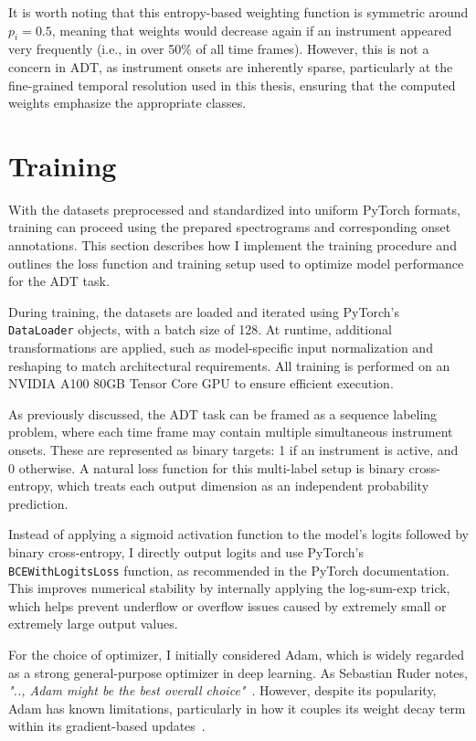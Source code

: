 It is worth noting that this entropy-based weighting function is symmetric around $p_i = 0.5$, meaning that weights would decrease again if an instrument appeared very frequently (i.e., in over 50\% of all time frames). However, this is not a concern in \gls{ADT}, as instrument onsets are inherently sparse, particularly at the fine-grained temporal resolution used in this thesis, ensuring that the computed weights emphasize the appropriate classes.

\section{Training}

With the datasets preprocessed and standardized into uniform PyTorch formats, training can proceed using the prepared spectrograms and corresponding onset annotations. This section describes how I implement the training procedure and outlines the loss function and training setup used to optimize model performance for the \gls{ADT} task.

During training, the datasets are loaded and iterated using PyTorch's \texttt{DataLoader} objects, with a batch size of 128. At runtime, additional transformations are applied, such as model-specific input normalization and reshaping to match architectural requirements. All training is performed on an NVIDIA A100 80GB Tensor Core GPU to ensure efficient execution.

As previously discussed, the \gls{ADT} task can be framed as a sequence labeling problem, where each time frame may contain multiple simultaneous instrument onsets. These are represented as binary targets: 1 if an instrument is active, and 0 otherwise. A natural loss function for this multi-label setup is binary cross-entropy, which treats each output dimension as an independent probability prediction. 

Instead of applying a sigmoid activation function to the model's logits followed by binary cross-entropy, I directly output logits and use PyTorch's \texttt{BCEWithLogitsLoss} function, as recommended in the PyTorch documentation. This improves numerical stability by internally applying the log-sum-exp trick, which helps prevent underflow or overflow issues caused by extremely small or extremely large output values.

For the choice of optimizer, I initially considered Adam, which is widely regarded as a strong general-purpose optimizer in deep learning. As Sebastian Ruder notes, \textit{".., Adam might be the best overall choice"}~\cite{ruder2017overviewgradientdescentoptimization}. However, despite its popularity, Adam has known limitations, particularly in how it couples its weight decay term within its gradient-based updates~\cite{kingma2017adammethodstochasticoptimization, bock2018improvementconvergenceproofadamoptimizer}.

